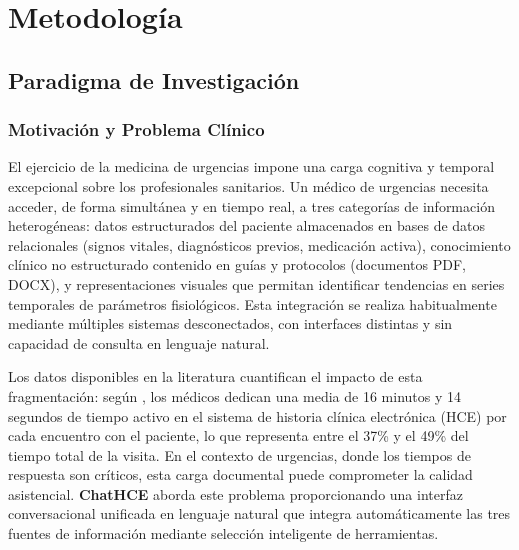 

\theoremstyle{definition}
\newtheorem{definition}{Definición}[section]
\newtheorem{proposition}{Proposición}[section]

\section{Metodología}

\subsection{Paradigma de Investigación}
\label{sec:paradigma}

\subsubsection{Motivación y Problema Clínico}

El ejercicio de la medicina de urgencias impone una carga cognitiva y temporal excepcional sobre los profesionales sanitarios. Un médico de urgencias necesita acceder, de forma simultánea y en tiempo real, a tres categorías de información heterogéneas: datos estructurados del paciente almacenados en bases de datos relacionales (signos vitales, diagnósticos previos, medicación activa), conocimiento clínico no estructurado contenido en guías y protocolos (documentos PDF, DOCX), y representaciones visuales que permitan identificar tendencias en series temporales de parámetros fisiológicos. Esta integración se realiza habitualmente mediante múltiples sistemas desconectados, con interfaces distintas y sin capacidad de consulta en lenguaje natural.

Los datos disponibles en la literatura cuantifican el impacto de esta fragmentación: según \citet{Arndt2017}, los médicos dedican una media de 16 minutos y 14 segundos de tiempo activo en el sistema de historia clínica electrónica (HCE) por cada encuentro con el paciente, lo que representa entre el 37\% y el 49\% del tiempo total de la visita. En el contexto de urgencias, donde los tiempos de respuesta son críticos, esta carga documental puede comprometer la calidad asistencial. \textbf{ChatHCE} aborda este problema proporcionando una interfaz conversacional unificada en lenguaje natural que integra automáticamente las tres fuentes de información mediante selección inteligente de herramientas.


